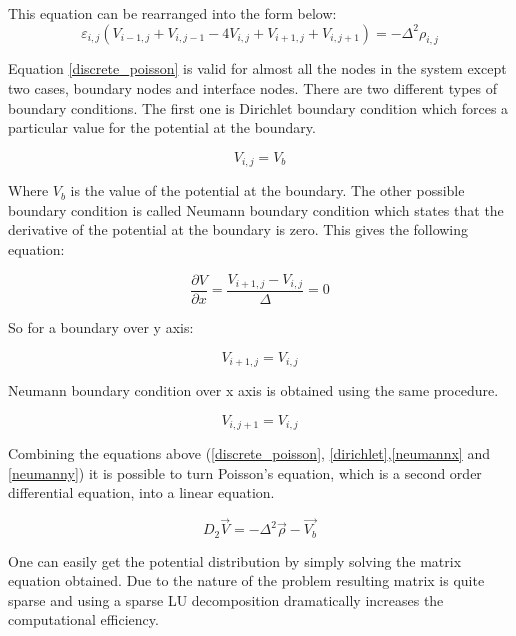 This equation can be rearranged into the form below:
\begin{equation}
\varepsilon_{i,j}(V_{i-1,j}+V_{i,j-1}-4V_{i,j}+V_{i+1,j}+V_{i,j+1})=-\Delta^2\rho_{i,j}
\label{discrete_poisson}
\end{equation}

Equation \ref{discrete_poisson} is valid for almost all the nodes in the system except two cases, boundary nodes and interface nodes. There are two different types of boundary conditions. The first one is Dirichlet boundary condition which forces a particular value for the potential at the boundary.

\begin{equation}
V_{i,j}=V_{b}
\label{dirichlet}
\end{equation}

Where $V_{b}$ is the value of the potential at the boundary. The other possible boundary condition is called Neumann boundary condition which states that the derivative of the potential at the boundary is zero. This gives the following equation:

\begin{equation}
\frac{\partial V}{\partial x}=\frac{V_{i+1,j}-V_{i,j}}{\Delta}=0
\label{neumannx}
\end{equation}

So for a boundary over y axis:

\begin{equation}
V_{i+1,j}=V_{i,j}
\label{neumanny}
\end{equation}

Neumann boundary condition over x axis is obtained using the same procedure.

\begin{equation}
V_{i,j+1}=V_{i,j}
\end{equation}

Combining the equations above (\ref{discrete_poisson}, \ref{dirichlet},\ref{neumannx} and \ref{neumanny}) it is possible to turn Poisson's equation, which is a second order differential equation, into a linear equation.

\begin{equation}
D_{2}\vec{V}=-\Delta^2\vec{\rho}-\vec{V_b}
\end{equation}

One can easily get the potential distribution by simply solving the matrix equation obtained. Due to the nature of the problem resulting matrix is quite sparse and using a sparse LU decomposition dramatically increases the computational efficiency.

